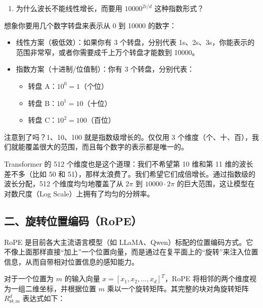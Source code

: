 \begin{enumerate}
\def\labelenumi{\arabic{enumi}.}
\setcounter{enumi}{2}
\tightlist
\item
  为什么波长不能线性增长，而要用 \(10000^{2i/d}\) 这种指数形式？
\end{enumerate}

想象你要用几个数字转盘来表示从 0 到 10000 的数字：

\begin{itemize}
\tightlist
\item
  线性方案（极低效）：如果你有 3 个转盘，分别代表 1s、2s、3s，你能表示的范围非常窄，或者你需要成千上万个转盘才能数到 10000。
\item
{}
  指数方案（十进制/位值制）：你有 3 个转盘，分别代表：

  \begin{itemize}
  \tightlist
  \item
    转盘 A：\(10^0=1\)（个位）
  \item
    转盘 B：\(10^1=10\)（十位）
  \item
    转盘 C：\(10^2=100\)（百位）
  \end{itemize}
\end{itemize}

注意到了吗？1、10、100 就是指数级增长的。仅仅用 3 个维度（个、十、百），我们就能覆盖很大的范围，而且每个数字的表示都是唯一的。

Transformer 的 512 个维度也是这个道理：我们不希望第 10 维和第 11 维的波长差不多（比如 50 和 51），那样太浪费了。我们希望它们成倍增长。通过指数级的波长分配，512 个维度均匀地覆盖了从 \(2\pi\) 到 \(10000\cdot2\pi\) 的巨大范围，这让模型在对数尺度（Log Scale）上拥有了均匀的分辨率。

\hypertarget{ux4e8cux65cbux8f6cux4f4dux7f6eux7f16ux7801rope}{%
\subsection{二、旋转位置编码（RoPE）}\label{ux4e8cux65cbux8f6cux4f4dux7f6eux7f16ux7801rope}}

RoPE 是目前各大主流语言模型（如 LLaMA、Qwen）标配的位置编码方式。它不像上面那样直接``加上''一个位置向量，而是通过在复平面上的``旋转''来注入位置信息，从而自带相对位置信息的感知能力。

对于一个位置为 \(m\) 的输入向量 \(x=[x_1,x_2,\ldots,x_d]^T\)，RoPE 将相邻的两个维度视为一组二维坐标，并根据位置 \(m\) 乘以一个旋转矩阵。其完整的块对角旋转矩阵 \(R_{\Theta,m}^{d}\) 表达式如下：


